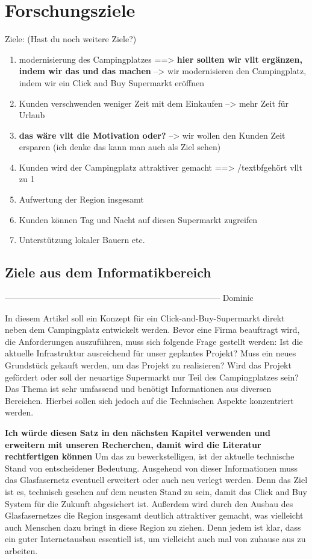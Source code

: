 \section{Forschungsziele}

Ziele: (Hast du noch weitere Ziele?)
\begin{enumerate}
    \item modernisierung des Campingplatzes ==> \textbf{hier sollten wir vllt ergänzen, indem wir das und das machen}
        --> wir modernisieren den Campingplatz, indem wir ein Click and Buy Supermarkt eröffnen
    \item Kunden verschwenden weniger Zeit mit dem Einkaufen --> mehr Zeit für Urlaub 
    \item \textbf{das wäre vllt die Motivation oder?} --> wir wollen den Kunden Zeit ersparen (ich denke das kann man auch als Ziel sehen)
    \item Kunden wird der Campingplatz attraktiver gemacht ==> /textbf{gehört vllt zu 1}
    \item Aufwertung der Region insgesamt
    \item Kunden können Tag und Nacht auf diesen Supermarkt zugreifen
    \item Unterstützung lokaler Bauern etc.
\end{enumerate}


\subsection{Ziele aus dem Informatikbereich}

----------------------------------------------------------------------------- Dominic

In diesem Artikel soll ein Konzept für ein Click-and-Buy-Supermarkt direkt neben dem Campingplatz entwickelt werden. 
Bevor eine Firma beauftragt wird, die Anforderungen auszuführen, muss sich folgende Frage gestellt werden: Ist die
aktuelle Infrastruktur ausreichend für unser geplantes Projekt? Muss ein neues Grundstück gekauft werden, um das 
Projekt zu realisieren? Wird das Projekt gefördert oder soll der neuartige Supermarkt nur Teil des Campingplatzes sein?
Das Thema ist sehr umfassend und benötigt Informationen aus diversen Bereichen. Hierbei sollen sich jedoch auf die 
Technischen Aspekte konzentriert werden.


\textbf{Ich würde diesen Satz in den nächsten Kapitel verwenden und erweitern mit unseren Recherchen, damit wird 
die Literatur rechtfertigen können}
Um das zu bewerkstelligen, ist der aktuelle technische Stand von entscheidener Bedeutung. 
Ausgehend von dieser Informationen muss das Glasfasernetz eventuell erweitert oder auch neu verlegt werden.
Denn das Ziel ist es, technisch gesehen auf dem neusten Stand zu sein, damit das Click and Buy System für die Zukunft abgesichert ist.
Außerdem wird durch den Ausbau des Glasfasernetzes die Region insgesamt deutlich attraktiver gemacht, was vielleicht auch Menschen dazu bringt
in diese Region zu ziehen. Denn jedem ist klar, dass ein guter Internetausbau essentiell ist, um vielleicht auch mal von zuhause aus zu arbeiten.


